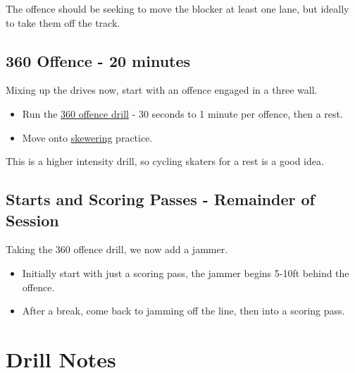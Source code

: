 \documentclass{journal}
\begin{document}
The offence should be seeking to move the blocker at least one lane, but ideally to take them off the track. 

\subsection*{360 Offence - 20 minutes}

Mixing up the drives now, start with an offence engaged in a three wall. 

\begin{itemize}
\item Run the \hyperref[drill:three_wall/360_offence]{360 offence drill} - 30 seconds to 1 minute per offence, then a rest.
\item Move onto \hyperref[drill:three_wall/skewering]{skewering} practice.
\end{itemize}

This is a higher intensity drill, so cycling skaters for a rest is a good idea.


\subsection*{Starts and Scoring Passes - Remainder of Session}

Taking the 360 offence drill, we now add a jammer.

\begin{itemize}
\item Initially start with just a scoring pass, the jammer begins 5-10ft behind the offence.
\item After a break, come back to jamming off the line, then into a scoring pass. 
\end{itemize}


\pagebreak


\section*{Drill Notes}















\end{document}
